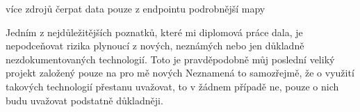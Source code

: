 \begin{conclusion}

více zdrojů
čerpat data pouze z endpointu
podrobnější mapy


Jedním z nejdůležitějších poznatků, které mi diplomová práce dala, je nepodceňovat rizika plynoucí z nových, neznámých nebo jen důkladně nezdokumentovaných technologií. Toto je pravděpodobně můj poslední veliký projekt založený pouze na pro mě nových  Neznamená to samozřejmě, že o využití takových technologií přestanu uvažovat, to v žádnem případě ne, pouze o nich budu uvažovat podstatně důkladněji.


% 
% 
% 

\end{conclusion}
